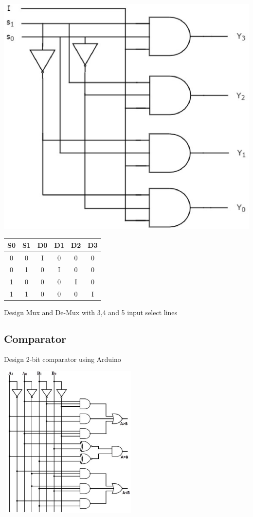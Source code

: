 \documentclass[journal,12pt,twocolumn]{IEEEtran}
\begin{document}
\vspace{0.5cm}
\includegraphics[scale=0.5]{img/14Demux}
\begin{table}[h!]
\centering
\begin{tabular}{|cc|cccc|}
\hline
S0	&	S1	&	D0	&	D1	&	D2	&	D3	 \\\hline
0	&	0	&	I	&	0	&	0	&	0	 	\\\hline
0	&	1	&	0	&	I	&	0	&	0		\\\hline
1	&	0	&	0	&	0	&	I	&	0		\\\hline
1	&	1	&	0	&	0	&	0	&	I		\\\hline

\end{tabular}
\end{table}

\problem Design Mux and De-Mux with 3,4 and 5 input select lines
\subsection{Comparator}
\problem Design 2-bit comparator using Arduino

\vspace{0.5cm}
\includegraphics[width = 7cm, height = 7.7cm]{img/2-Bit-Comparator-Logic-Diagram}
\end{document}
